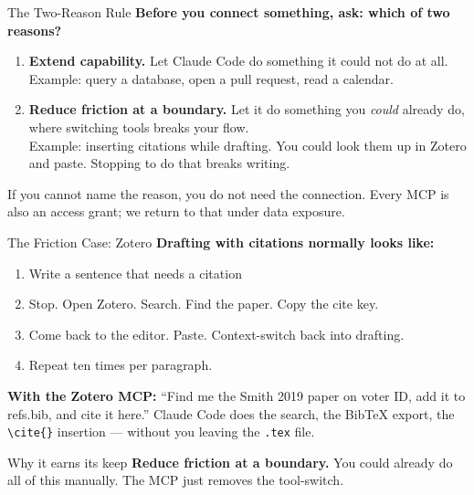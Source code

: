 \documentclass[aspectratio=169, 11pt]{beamer}
\begin{document}
\begin{frame}{The Two-Reason Rule}
  \textbf{Before you connect something, ask: which of two reasons?}

  \vspace{0.6em}
  \begin{enumerate}
    \item \textbf{Extend capability.} Let Claude Code do something it could not do at all.\\
    {\small Example: query a database, open a pull request, read a calendar.}

    \vspace{0.4em}
    \item \textbf{Reduce friction at a boundary.} Let it do something you \emph{could} already do, where switching tools breaks your flow.\\
    {\small Example: inserting citations while drafting. You could look them up in Zotero and paste. Stopping to do that breaks writing.}
  \end{enumerate}

  \vspace{0.8em}
  \alert{If you cannot name the reason, you do not need the connection. Every MCP is also an access grant; we return to that under data exposure.}
\end{frame}

\begin{frame}{The Friction Case: Zotero}
  \textbf{Drafting with citations normally looks like:}

  \vspace{0.3em}
  \begin{enumerate}
    \item Write a sentence that needs a citation
    \item Stop. Open Zotero. Search. Find the paper. Copy the cite key.
    \item Come back to the editor. Paste. Context-switch back into drafting.
    \item Repeat ten times per paragraph.
  \end{enumerate}

  \vspace{0.5em}
  \textbf{With the Zotero MCP:} ``Find me the Smith 2019 paper on voter ID, add it to refs.bib, and cite it here.'' Claude Code does the search, the BibTeX export, the \texttt{\textbackslash cite\{\}} insertion --- without you leaving the \texttt{.tex} file.

  \vspace{0.5em}
  \begin{block}{Why it earns its keep}
    \textbf{Reduce friction at a boundary.} You could already do all of this manually. The MCP just removes the tool-switch.
  \end{block}
\end{frame}
\end{document}
